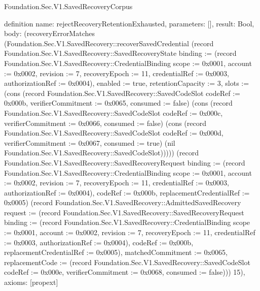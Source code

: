 \begin{lexlean}{Foundation.Sec.V1.SavedRecoveryCorpus}
\begin{semanticmodule}
definition{
  name: rejectRecoveryRetentionExhausted,
  parameters: [],
  result: Bool,
  body: (recoveryErrorMatches (Foundation.Sec.V1.SavedRecovery::recoverSavedCredential (record Foundation.Sec.V1.SavedRecovery::SavedRecoveryState {binding := (record Foundation.Sec.V1.SavedRecovery::CredentialBinding {scope := 0x0001, account := 0x0002, revision := 7, recoveryEpoch := 11, credentialRef := 0x0003, authorizationRef := 0x0004}), enabled := true, retentionCapacity := 3, slots := (cons (record Foundation.Sec.V1.SavedRecovery::SavedCodeSlot {codeRef := 0x000b, verifierCommitment := 0x0065, consumed := false}) (cons (record Foundation.Sec.V1.SavedRecovery::SavedCodeSlot {codeRef := 0x000c, verifierCommitment := 0x0066, consumed := false}) (cons (record Foundation.Sec.V1.SavedRecovery::SavedCodeSlot {codeRef := 0x000d, verifierCommitment := 0x0067, consumed := true}) (nil Foundation.Sec.V1.SavedRecovery::SavedCodeSlot))))}) (record Foundation.Sec.V1.SavedRecovery::SavedRecoveryRequest {binding := (record Foundation.Sec.V1.SavedRecovery::CredentialBinding {scope := 0x0001, account := 0x0002, revision := 7, recoveryEpoch := 11, credentialRef := 0x0003, authorizationRef := 0x0004}), codeRef := 0x000b, replacementCredentialRef := 0x0005}) (record Foundation.Sec.V1.SavedRecovery::AdmittedSavedRecovery {request := (record Foundation.Sec.V1.SavedRecovery::SavedRecoveryRequest {binding := (record Foundation.Sec.V1.SavedRecovery::CredentialBinding {scope := 0x0001, account := 0x0002, revision := 7, recoveryEpoch := 11, credentialRef := 0x0003, authorizationRef := 0x0004}), codeRef := 0x000b, replacementCredentialRef := 0x0005}), matchedCommitment := 0x0065, replacementCode := (record Foundation.Sec.V1.SavedRecovery::SavedCodeSlot {codeRef := 0x000e, verifierCommitment := 0x0068, consumed := false})})) 15),
  axioms: [propext]
}


\end{semanticmodule}
\end{lexlean}
